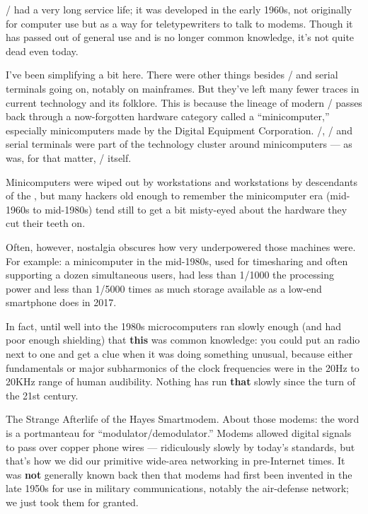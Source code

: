 \RSTTT/ had a very long service life; it was developed in the early 1960s, not
originally for computer use but as a way for teletypewriters to talk to modems.
Though it has passed out of general use and is no longer common knowledge, it's
not quite dead even today.

I've been simplifying a bit here. There were other things besides \RSTTT/ and
serial terminals going on, notably on  mainframes. But they've left many
fewer traces in current technology and its folklore. This is because the
lineage of modern \UNIX/ passes back through a now-forgotten hardware category
called a ``minicomputer,'' especially minicomputers made by the Digital Equipment
Corporation. \ASCII/, \RSTTT/ and serial terminals were part of the technology
cluster around minicomputers --- as was, for that matter, \UNIX/ itself.

Minicomputers were wiped out by workstations and workstations by descendants of
the , but many hackers old enough to remember the minicomputer era
(mid-1960s to mid-1980s) tend still to get a bit misty-eyed about the 
hardware they cut their teeth on.

Often, however, nostalgia obscures how very underpowered those machines were.
For example: a  minicomputer in the mid-1980s, used for
timesharing and often supporting a dozen simultaneous users, had less than
1/1000 the processing power and less than 1/5000 times as much storage
available as a low-end smartphone does in 2017.

In fact, until well into the 1980s microcomputers ran slowly enough (and had
poor enough  shielding) that {\bf this} was common knowledge: you
could put an  radio next to one and get a clue when it was doing
something unusual, because either fundamentals or major subharmonics of the
clock frequencies were in the 20Hz to 20KHz range of human audibility. Nothing
has run {\bf that} slowly since the turn of the 21st century.

\sect The Strange Afterlife of the Hayes Smartmodem.
About those modems: the word is a portmanteau for ``modulator/demodulator.''
Modems allowed digital signals to pass over copper phone wires --- ridiculously
slowly by today's standards, but that's how we did our primitive wide-area
networking in pre-Internet times. It was {\bf not} generally known back then that
modems had first been invented in the late 1950s for use in military
communications, notably the  air-defense network; we just took them for
granted.

